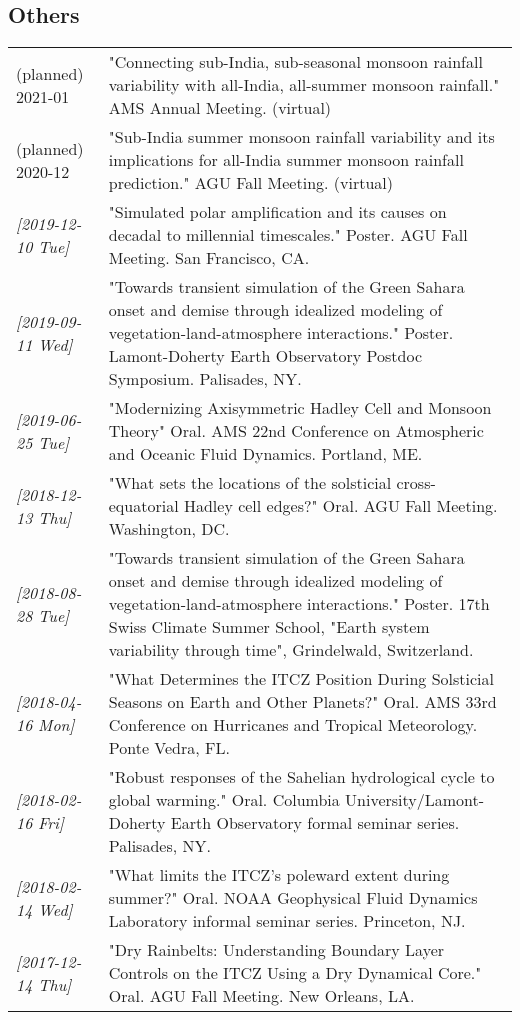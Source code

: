 \documentclass[12pt,letterpaper]{shillcv}
\begin{document}
\subsection*{Others}
\label{sec:org111f822}
\begin{center}
\begin{tabularx}{\textwidth}{lX}
(planned) 2021-01 & "Connecting sub-India, sub-seasonal monsoon rainfall variability with all-India, all-summer monsoon rainfall." AMS Annual Meeting.  (virtual)\\
(planned) 2020-12 & "Sub-India summer monsoon rainfall variability and its implications for all-India summer monsoon rainfall prediction."  AGU Fall Meeting.  (virtual)\\
\textit{[2019-12-10 Tue]} & "Simulated polar amplification and its causes on decadal to millennial timescales."  Poster.  AGU Fall Meeting.  San Francisco, CA.\\
\textit{[2019-09-11 Wed]} & "Towards transient simulation of the Green Sahara onset and demise through idealized modeling of vegetation-land-atmosphere interactions."  Poster.  Lamont-Doherty Earth Observatory Postdoc Symposium.  Palisades, NY.\\
\textit{[2019-06-25 Tue]} & "Modernizing Axisymmetric Hadley Cell and Monsoon Theory"  Oral.  AMS 22nd Conference on Atmospheric and Oceanic Fluid Dynamics.  Portland, ME.\\
\textit{[2018-12-13 Thu]} & "What sets the locations of the solsticial cross-equatorial Hadley cell edges?"  Oral.  AGU Fall Meeting.  Washington, DC.\\
\textit{[2018-08-28 Tue]} & "Towards transient simulation of the Green Sahara onset and demise through idealized modeling of vegetation-land-atmosphere interactions."  Poster.  17th Swiss Climate Summer School, "Earth system variability through time", Grindelwald, Switzerland.\\
\textit{[2018-04-16 Mon]} & "What Determines the ITCZ Position During Solsticial Seasons on Earth and Other Planets?"  Oral.  AMS 33rd Conference on Hurricanes and Tropical Meteorology.  Ponte Vedra, FL.\\
\textit{[2018-02-16 Fri]} & "Robust responses of the Sahelian hydrological cycle to global warming."  Oral.  Columbia University/Lamont-Doherty Earth Observatory formal seminar series.  Palisades, NY.\\
\textit{[2018-02-14 Wed]} & "What limits the ITCZ's poleward extent during summer?"  Oral.  NOAA Geophysical Fluid Dynamics Laboratory informal seminar series.  Princeton, NJ.\\
\textit{[2017-12-14 Thu]} & "Dry Rainbelts: Understanding Boundary Layer Controls on the ITCZ Using a Dry Dynamical Core."  Oral.  AGU Fall Meeting.  New Orleans, LA.\\
\end{tabularx}
\end{center}
\end{document}
